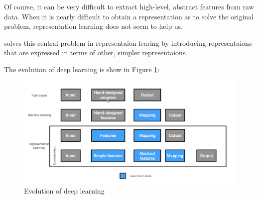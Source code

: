 Of course, it can be very difficult to extract high-level, abstract features from raw data.
When it is nearly difficult to obtain a representation as to solve the original problem, representation learning does not seem to help us.


 solves this central problem in representaion learing by introducing representaions that are expressed in terms of other, simpler representaions.


The evolution of deep learning is show in Figure \ref{fig:evolution-of-deep-learning}:
\begin{figure}[!ht]
  \centering
  \includegraphics[width=\textwidth]{evolution-of-deep-learning.png}
  \caption{Evolution of deep learning}
  \label{fig:evolution-of-deep-learning}
\end{figure}